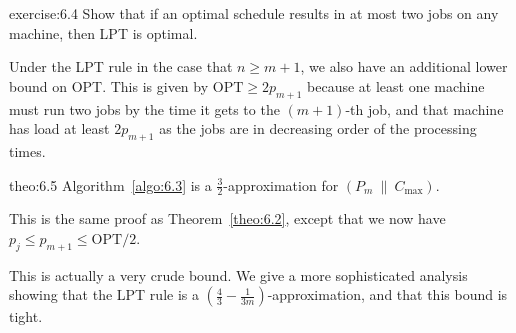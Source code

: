 \begin{exercise}{exercise:6.4}
    Show that if an optimal schedule results in at most two jobs on any
    machine, then LPT is optimal.
\end{exercise}

Under the LPT rule in the case that $n \geq m+1$, we also have an additional 
lower bound on OPT. This is given by $\text{OPT} \geq 2p_{m+1}$ because 
at least one machine must run two jobs by the time it gets to the 
$(m+1)$-th job, and that machine has load at least $2p_{m+1}$ as the 
jobs are in decreasing order of the processing times. 

\begin{theo}{theo:6.5}
    Algorithm~\ref{algo:6.3} is a $\frac32$-approximation for $(P_m~\|~C_{\max})$.
\end{theo}
\begin{pf}
    This is the same proof as Theorem~\ref{theo:6.2}, except that we now 
    have $p_j \leq p_{m+1} \leq \text{OPT}/2$. 
\end{pf}

This is actually a very crude bound. We give a more sophisticated analysis 
showing that the LPT rule is a $(\frac43 - \frac{1}{3m})$-approximation, 
and that this bound is tight.  

